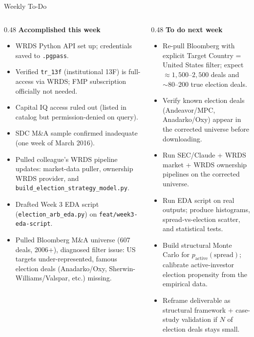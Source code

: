 \documentclass[aspectratio=169,11pt]{beamer}
\begin{document}
\begin{frame}{Weekly To-Do}
\small
\begin{columns}[T]
\begin{column}{0.48\linewidth}
\textbf{Accomplished this week}
\begin{itemize}
  \item WRDS Python API set up; credentials saved to \texttt{.pgpass}.
  \item Verified \texttt{tr\_13f} (institutional 13F) is full-access via WRDS; FMP subscription officially not needed.
  \item Capital IQ access ruled out (listed in catalog but permission-denied on query).
  \item SDC M\&A sample confirmed inadequate (one week of March 2016).
  \item Pulled colleague's WRDS pipeline updates: market-data puller, ownership WRDS provider, and \texttt{build\_election\_strategy\_model.py}.
  \item Drafted Week 3 EDA script (\texttt{election\_arb\_eda.py}) on \texttt{feat/week3-eda-script}.
  \item Pulled Bloomberg M\&A universe (607 deals, 2006+), diagnosed filter issue: US targets under-represented, famous election deals (Anadarko/Oxy, Sherwin-Williams/Valspar, etc.) missing.
\end{itemize}
\end{column}
\begin{column}{0.48\linewidth}
\textbf{To do next week}
\begin{itemize}
  \item Re-pull Bloomberg with explicit Target Country = United States filter; expect $\approx 1{,}500$--$2{,}500$ deals and $\sim 80$--$200$ true election deals.
  \item Verify known election deals (Andeavor/MPC, Anadarko/Oxy) appear in the corrected universe before downloading.
  \item Run SEC/Claude + WRDS market + WRDS ownership pipelines on the corrected universe.
  \item Run EDA script on real outputs; produce histograms, spread-vs-election scatter, and statistical tests.
  \item Build structural Monte Carlo for $p_{\text{active}}(\text{spread})$; calibrate active-investor election propensity from the empirical data.
  \item Reframe deliverable as structural framework + case-study validation if $N$ of election deals stays small.
\end{itemize}
\end{column}
\end{columns}
\end{frame}
\end{document}
